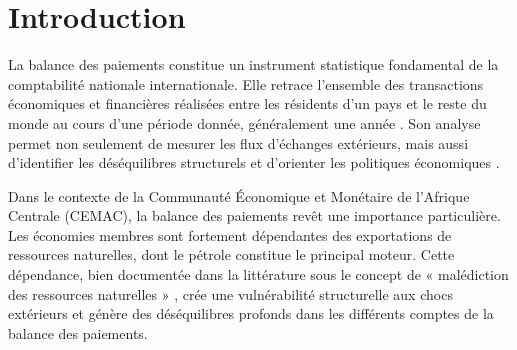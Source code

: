 \documentclass[12pt,a4paper]{article}
\begin{document}
\begin{abstract}
Ce rapport analyse et compare la balance des paiements (BDP) de la République du Congo,
de la République Gabonaise et de la République du Tchad pour l'exercice 2021, à partir des
données statistiques officielles publiées par la Banque des États de l'Afrique Centrale
(BEAC) conformément à la norme BPM6 du Fonds Monétaire International (FMI, 2009). L'étude
examine les principaux soldes -- compte courant, compte de capital, compte financier -- et
leurs implications macroéconomiques, les termes d'échange extérieurs, et la soutenabilité
des positions extérieures de chaque pays. Les résultats montrent que les trois économies,
bien qu'excédentaires en courant en 2021 grâce au rebond des prix pétroliers, présentent des
vulnérabilités structurelles communes caractéristiques du syndrome hollandais
\parencite{cordenneary1982} : déficits profonds des services et du revenu primaire, forte
dépendance aux investisseurs étrangers, et taux de rétention des revenus d'exportation
inférieur à 65\,\%. Ces résultats appellent des politiques de diversification économique
urgentes dans les trois pays membres de la CEMAC.
\end{abstract}

\newpage
\tableofcontents
\newpage

\section{Introduction}

La balance des paiements constitue un instrument statistique fondamental de la comptabilité
nationale internationale. Elle retrace l'ensemble des transactions économiques et financières
réalisées entre les résidents d'un pays et le reste du monde au cours d'une période donnée,
généralement une année \parencite{imf2009bpm6}. Son analyse permet non seulement de mesurer
les flux d'échanges extérieurs, mais aussi d'identifier les déséquilibres structurels et
d'orienter les politiques économiques \parencite{krugmanobstfeld2018}.

Dans le contexte de la Communauté Économique et Monétaire de l'Afrique Centrale (CEMAC),
la balance des paiements revêt une importance particulière. Les économies membres sont
fortement dépendantes des exportations de ressources naturelles, dont le pétrole constitue
le principal moteur. Cette dépendance, bien documentée dans la littérature sous le concept
de « malédiction des ressources naturelles » \parencite{sachswarner1995}, crée une
vulnérabilité structurelle aux chocs extérieurs et génère des déséquilibres profonds dans
les différents comptes de la balance des paiements.
\end{document}
